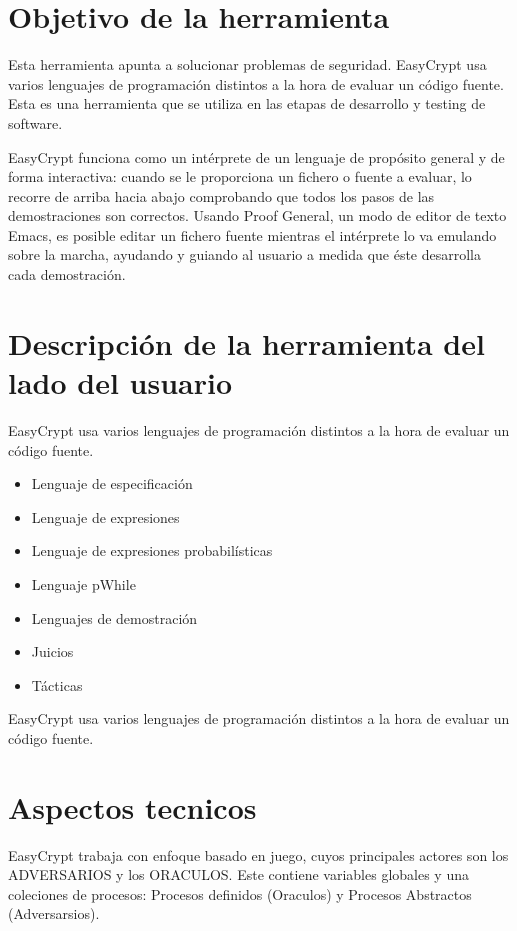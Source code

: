 \documentclass[runningheads,a4paper]{llncs}
\begin{document}
\section{Objetivo de la herramienta} 

Esta herramienta apunta a solucionar problemas de seguridad. EasyCrypt usa varios lenguajes de programación distintos a la hora de evaluar un código fuente. Esta es una herramienta que se utiliza en las etapas de desarrollo y testing de software. 

EasyCrypt funciona como un intérprete de un lenguaje de propósito general y de forma interactiva: cuando se le proporciona un fichero o fuente a evaluar, lo recorre de arriba hacia abajo comprobando que todos los pasos de las demostraciones son correctos. Usando Proof General, un modo de editor de texto Emacs, es posible editar un fichero fuente mientras el intérprete lo va emulando sobre la marcha, ayudando y guiando al usuario a medida que éste desarrolla cada demostración. 

\section{Descripción de la herramienta del lado del usuario}

EasyCrypt usa varios lenguajes de programación distintos a la hora de evaluar un código fuente. 

\begin{itemize}
	\item Lenguaje de especificación
	\item Lenguaje de expresiones
	\item Lenguaje de expresiones probabilísticas
	\item Lenguaje pWhile
	\item Lenguajes de demostración
	\item Juicios
	\item Tácticas
\end{itemize}

EasyCrypt usa varios lenguajes de programación distintos a la hora de evaluar un código fuente. 

\section{Aspectos tecnicos}
EasyCrypt trabaja con enfoque basado en juego, cuyos principales actores son los ADVERSARIOS y los ORACULOS. Este contiene variables globales y una coleciones de procesos: Procesos definidos (Oraculos) y Procesos Abstractos (Adversarsios).
\end{document}
